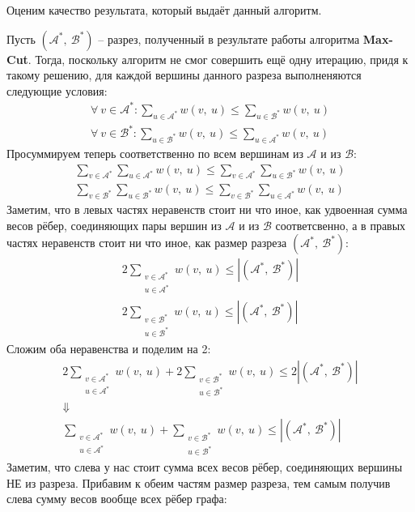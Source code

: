 \documentclass[a4paper,12pt]{article}
\newcommand{\A}{\mathcal{A}}
\newcommand{\B}{\mathcal{B}}
\begin{document}
Оценим качество результата, который выдаёт данный алгоритм. 

Пусть $(\A^*,\ \B^*)$ -- разрез, полученный в результате работы алгоритма \textbf{Max-Cut}. Тогда, поскольку алгоритм не смог совершить ещё одну итерацию, придя к такому решению, для каждой вершины данного разреза выполненяются следующие условия:
\begin{gather*}
    \forall\ v \in \A^*: \sum\limits_{u \in \A^*}w(v,\ u) \leqslant \sum\limits_{u \in \B^*}w(v,\ u)\\
    \forall\ v \in \B^*: \sum\limits_{u \in \B^*}w(v,\ u) \leqslant \sum\limits_{u \in \A^*}w(v,\ u)
\end{gather*}
Просуммируем теперь соответственно по всем вершинам из $\A$ и из $\B$:
\begin{gather*}
    \sum\limits_{v \in \A^*}\sum\limits_{u \in \A^*}w(v,\ u) \leqslant \sum\limits_{v \in \A^*}\sum\limits_{u \in \B^*}w(v,\ u)\\
    \sum\limits_{v \in \B^*}\sum\limits_{u \in \B^*}w(v,\ u) \leqslant \sum\limits_{v \in \B^*}\sum\limits_{u \in \A^*}w(v,\ u)
\end{gather*}
Заметим, что в левых частях неравенств стоит ни что иное, как удвоенная сумма весов рёбер, соединяющих пары вершин из $\A$ и из $\B$ соответсвенно, а в правых частях неравенств стоит ни что иное, как размер разреза $(\A^*,\ \B^*)$:
\begin{gather*}
    2\sum\limits_{\substack{v \in \A^*\\u \in \A^*}}w(v,\ u) \leqslant |(\A^*,\ \B^*)|\\
    2\sum\limits_{\substack{v \in \B^*\\u \in \B^*}}w(v,\ u) \leqslant |(\A^*,\ \B^*)|
\end{gather*}
Сложим оба неравенства и поделим на 2:
\begin{gather*}
    2\sum\limits_{\substack{v \in \A^*\\u \in \A^*}}w(v,\ u) +  2\sum\limits_{\substack{v \in \B^*\\u \in \B^*}}w(v,\ u) \leqslant 2|(\A^*,\ \B^*)|\\ \Downarrow\\
    \sum\limits_{\substack{v \in \A^*\\u \in \A^*}}w(v,\ u) +  \sum\limits_{\substack{v \in \B^*\\u \in \B^*}}w(v,\ u) \leqslant |(\A^*,\ \B^*)|
\end{gather*}
Заметим, что слева у нас стоит сумма всех весов рёбер, соединяющих вершины НЕ из разреза. Прибавим к обеим частям размер разреза, тем самым получив слева сумму весов вообще всех рёбер графа:
\end{document}
